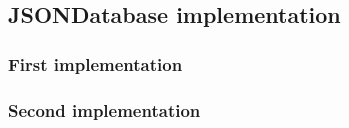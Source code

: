 \subsection{JSONDatabase implementation}

\subsubsection{First implementation}

\subsubsection{Second implementation}
